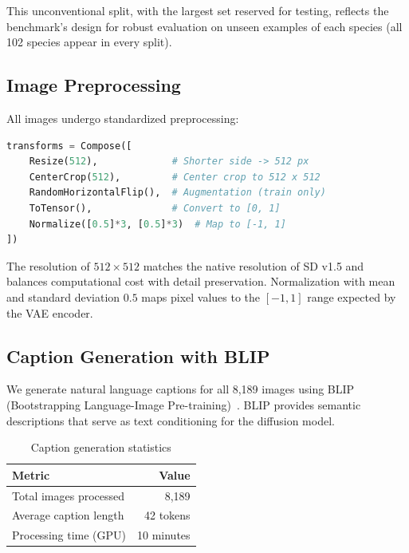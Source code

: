 \documentclass[11pt]{article}
\begin{document}
This unconventional split, with the largest set reserved for testing, reflects the benchmark's design for robust evaluation on unseen examples of each species (all 102 species appear in every split).

\subsection{Image Preprocessing}

All images undergo standardized preprocessing:

\begin{lstlisting}[language=Python, caption=Image preprocessing pipeline]
transforms = Compose([
    Resize(512),             # Shorter side -> 512 px
    CenterCrop(512),         # Center crop to 512 x 512
    RandomHorizontalFlip(),  # Augmentation (train only)
    ToTensor(),              # Convert to [0, 1]
    Normalize([0.5]*3, [0.5]*3)  # Map to [-1, 1]
])
\end{lstlisting}

The resolution of $512 \times 512$ matches the native resolution of SD v1.5 and balances computational cost with detail preservation. Normalization with mean and standard deviation $0.5$ maps pixel values to the $[-1,1]$ range expected by the VAE encoder.

\subsection{Caption Generation with BLIP}

We generate natural language captions for all 8,189 images using BLIP (Bootstrapping Language-Image Pre-training)~\cite{li2022blip}. BLIP provides semantic descriptions that serve as text conditioning for the diffusion model.

\begin{table}[!htbp]
\centering
\caption{Caption generation statistics}
\begin{tabular}{lr}
\toprule
Metric & Value \\
\midrule
Total images processed & 8,189 \\
Average caption length & 42 tokens \\ %
Processing time (GPU) & 10 minutes \\
\bottomrule
\end{tabular}
\end{table}
\end{document}
